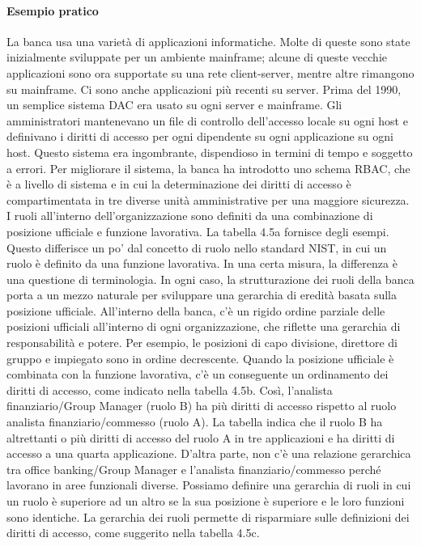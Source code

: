 \paragraph{Esempio pratico} La banca usa una varietà di applicazioni informatiche. Molte di queste sono state inizialmente sviluppate per un ambiente mainframe; alcune di queste vecchie applicazioni sono ora supportate su una rete client-server, mentre altre rimangono su mainframe. Ci sono anche applicazioni più recenti su server. Prima del 1990, un semplice sistema DAC era usato su ogni server e mainframe. Gli amministratori mantenevano un file di controllo dell'accesso locale su ogni host e definivano i diritti di accesso per ogni dipendente su ogni applicazione su ogni host. Questo sistema era ingombrante, dispendioso in termini di tempo e soggetto a errori. Per migliorare il sistema, la banca ha introdotto uno schema RBAC, che è a livello di sistema e in cui la determinazione dei diritti di accesso è compartimentata in tre diverse unità amministrative per una maggiore sicurezza. I ruoli all'interno dell'organizzazione sono definiti da una combinazione di posizione ufficiale e funzione lavorativa. La tabella 4.5a fornisce degli esempi. Questo differisce un po' dal concetto di ruolo nello standard NIST, in cui un ruolo è definito da una funzione lavorativa. In una certa misura, la differenza è una questione di terminologia. In ogni caso, la strutturazione dei ruoli della banca porta a un mezzo naturale per sviluppare una gerarchia di eredità basata sulla posizione ufficiale. All'interno della banca, c'è un rigido ordine parziale delle posizioni ufficiali all'interno di ogni organizzazione, che riflette una gerarchia di responsabilità e potere. Per esempio, le posizioni di capo divisione, direttore di gruppo e impiegato sono in ordine decrescente. Quando la posizione ufficiale è combinata con la funzione lavorativa, c'è un conseguente un ordinamento dei diritti di accesso, come indicato nella tabella 4.5b. Così, l'analista finanziario/Group Manager (ruolo B) ha più diritti di accesso rispetto al ruolo analista finanziario/commesso (ruolo A). La tabella indica che il ruolo B ha altrettanti o più diritti di accesso del ruolo A in tre applicazioni e ha diritti di accesso a una quarta applicazione. D'altra parte, non c'è una relazione gerarchica tra office banking/Group Manager e l'analista finanziario/commesso perché lavorano in aree funzionali diverse. Possiamo definire una gerarchia di ruoli in cui un ruolo è superiore ad un altro se la sua posizione è superiore e le loro funzioni sono identiche. La gerarchia dei ruoli permette di risparmiare sulle definizioni dei diritti di accesso, come suggerito nella tabella 4.5c.

